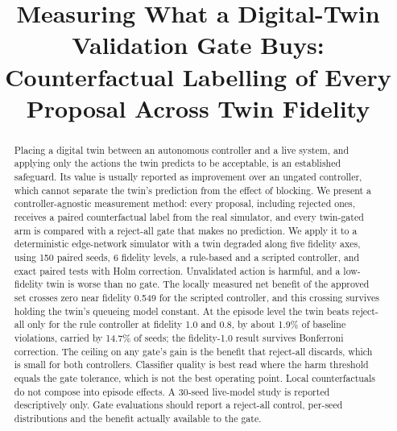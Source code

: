 \documentclass[conference]{IEEEtran}
\begin{document}
\title{Measuring What a Digital-Twin Validation Gate Buys: Counterfactual Labelling of Every Proposal Across Twin Fidelity}

\author{
}

\maketitle

\begin{abstract}
Placing a digital twin between an autonomous controller and a live system, and applying only the actions the twin predicts to be acceptable, is an established safeguard. Its value is usually reported as improvement over an ungated controller, which cannot separate the twin's prediction from the effect of blocking. We present a controller-agnostic measurement method: every proposal, including rejected ones, receives a paired counterfactual label from the real simulator, and every twin-gated arm is compared with a reject-all gate that makes no prediction. We apply it to a deterministic edge-network simulator with a twin degraded along five fidelity axes, using 150 paired seeds, 6 fidelity levels, a rule-based and a scripted controller, and exact paired tests with Holm correction. Unvalidated action is harmful, and a low-fidelity twin is worse than no gate. The locally measured net benefit of the approved set crosses zero near fidelity 0.549 for the scripted controller, and this crossing survives holding the twin's queueing model constant. At the episode level the twin beats reject-all only for the rule controller at fidelity 1.0 and 0.8, by about 1.9\% of baseline violations, carried by 14.7\% of seeds; the fidelity-1.0 result survives Bonferroni correction. The ceiling on any gate's gain is the benefit that reject-all discards, which is small for both controllers. Classifier quality is best read where the harm threshold equals the gate tolerance, which is not the best operating point. Local counterfactuals do not compose into episode effects. A 30-seed live-model study is reported descriptively only. Gate evaluations should report a reject-all control, per-seed distributions and the benefit actually available to the gate.
\end{abstract}
\end{document}
